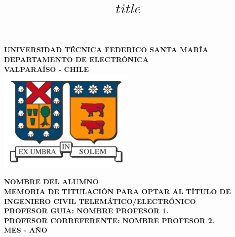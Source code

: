 \documentclass[letterpaper,12pt,twoside]{article}
\begin{document}
\begin{center}
\linespread{1.15}
\textbf{\large{UNIVERSIDAD TÉCNICA FEDERICO SANTA MARÍA\\}
\normalsize{DEPARTAMENTO DE ELECTRÓNICA\\VALPARAÍSO - CHILE\\}}
\vspace{0.5cm}
\includegraphics[width=0.5\textwidth]{ISOTIPO_Color.jpg}
\vskip 1cm

\title{$title$}

\vskip 1.5cm
\end{center}

\begin{center}
\hangindent=0cm\large \textbf{NOMBRE DEL ALUMNO}\\
\vspace{0.5cm}
\hangindent=0cm\normalsize \textbf{MEMORIA DE TITULACIÓN PARA OPTAR AL TÍTULO DE INGENIERO CIVIL TELEMÁTICO/ELECTRÓNICO}\\
\vspace{1cm}
\hangindent=0cm\normalsize \textbf{PROFESOR GUIA: \hspace{2cm} NOMBRE PROFESOR 1.}\\
\vspace{0.5cm}
\hangindent=0cm\normalsize \textbf{PROFESOR CORREFERENTE: \hspace{2cm} NOMBRE PROFESOR 2.}\\
\vskip 1cm
\textbf{MES - AÑO}
\end{center}
\thispagestyle{empty}

\newpage
\thispagestyle{empty}
\cleardoublepage
\pagestyle{fancy}
\renewcommand\headrulewidth{0pt}

% 

\newpage
\thispagestyle{empty}
\renewcommand{\contentsname}{\'Indice general}
\tableofcontents
\end{document}
